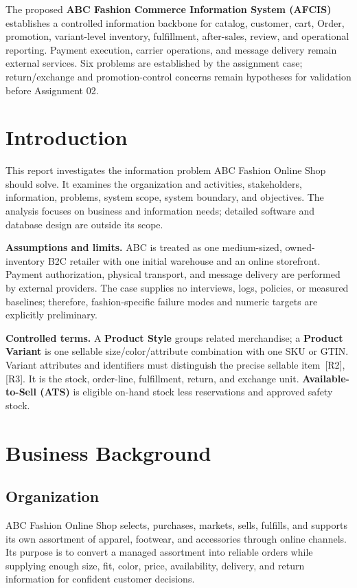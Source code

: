 \documentclass[10pt,a4paper]{article}
\newcommand{\keyterm}[1]{\textbf{#1}}
\begin{document}
\begin{titlepage}
The proposed \keyterm{ABC Fashion Commerce Information System (AFCIS)} establishes a controlled information backbone for catalog, customer, cart, Order, promotion, variant-level inventory, fulfillment, after-sales, review, and operational reporting. Payment execution, carrier operations, and message delivery remain external services. Six problems are established by the assignment case; return/exchange and promotion-control concerns remain hypotheses for validation before Assignment 02.

\end{titlepage}
\hypersetup{pageanchor=true}

\section{Introduction}
This report investigates the information problem ABC Fashion Online Shop should solve. It examines the organization and activities, stakeholders, information, problems, system scope, system boundary, and objectives. The analysis focuses on business and information needs; detailed software and database design are outside its scope.

\textbf{Assumptions and limits.} ABC is treated as one medium-sized, owned-inventory B2C retailer with one initial warehouse and an online storefront. Payment authorization, physical transport, and message delivery are performed by external providers. The case supplies no interviews, logs, policies, or measured baselines; therefore, fashion-specific failure modes and numeric targets are explicitly preliminary.

\textbf{Controlled terms.} A \keyterm{Product Style} groups related merchandise; a \keyterm{Product Variant} is one sellable size/\allowbreak color/\allowbreak attribute combination with one SKU or GTIN. Variant attributes and identifiers must distinguish the precise sellable item~[R2], [R3]. It is the stock, order-line, fulfillment, return, and exchange unit. \keyterm{Available-to-\allowbreak Sell (ATS)} is eligible on-hand stock less reservations and approved safety stock.

\section{Business Background}
\subsection{Organization}
ABC Fashion Online Shop selects, purchases, markets, sells, fulfills, and supports its own assortment of apparel, footwear, and accessories through online channels. Its purpose is to convert a managed assortment into reliable orders while supplying enough size, fit, color, price, availability, delivery, and return information for confident customer decisions.
\end{document}

